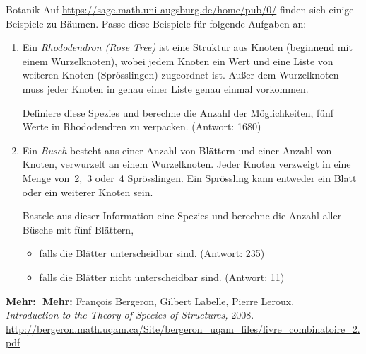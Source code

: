\documentclass{pizzablatt}
\begin{document}
\begin{aufgabe}{Botanik}
Auf \url{https://sage.math.uni-augsburg.de/home/pub/0/} finden sich einige
Beispiele zu Bäumen. Passe diese Beispiele für folgende Aufgaben an:
\begin{enumerate}
\item Ein \emph{Rhododendron (Rose Tree)} ist eine Struktur aus Knoten (beginnend
mit einem Wurzelknoten), wobei jedem Knoten ein Wert und eine Liste von
weiteren Knoten (Sprösslingen) zugeordnet ist. Außer dem Wurzelknoten muss
jeder Knoten in genau einer Liste genau einmal vorkommen.

Definiere diese Spezies und berechne die Anzahl der Möglichkeiten, fünf Werte
in Rhododendren zu verpacken. (Antwort: 1680)
\item Ein \emph{Busch} besteht aus einer Anzahl von Blättern und einer Anzahl
von Knoten, verwurzelt an einem Wurzelknoten. Jeder Knoten verzweigt in eine
Menge von~2,~3 oder~4 Sprösslingen. Ein Sprössling kann entweder ein Blatt oder
ein weiterer Knoten sein.

Bastele aus dieser Information eine Spezies und
berechne die Anzahl aller Büsche mit fünf Blättern,
\begin{itemize}
\item falls die Blätter unterscheidbar sind. (Antwort: 235)
\item falls die Blätter nicht unterscheidbar sind. (Antwort: 11)
\end{itemize}
\end{enumerate}
\end{aufgabe}

\begin{tabbing}
  \textbf{Mehr:} \= \kill
  \textbf{Mehr:} \>
  François Bergeron, Gilbert Labelle, Pierre Leroux. \\
  \> \emph{Introduction to the Theory of Species of Structures,} 2008.\\
  \> \small
  \url{http://bergeron.math.uqam.ca/Site/bergeron_uqam_files/livre_combinatoire_2.pdf}
\end{tabbing}
\end{document}
